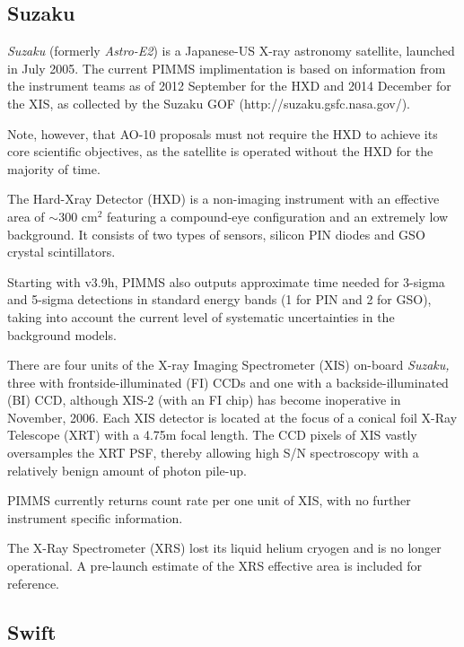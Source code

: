 \documentclass[11pt]{article}
\begin{document}
\subsection{Suzaku}

{\em Suzaku\/} (formerly {\em Astro-E2\/}) is a Japanese-US X-ray astronomy
satellite, launched in July 2005.  The current PIMMS implimentation is based
on information from the instrument teams as of 2012 September for the HXD
and 2014 December for the XIS, as collected by the Suzaku GOF
(http://suzaku.gsfc.nasa.gov/).

Note, however, that AO-10 proposals must not require the HXD to
achieve its core scientific objectives, as the satellite is operated
without the HXD for the majority of time.

The Hard-Xray Detector (HXD) is a non-imaging instrument with an effective
area of $\sim$300 cm$^2$ featuring a compound-eye configuration and an
extremely low background.  It consists of two types of sensors, silicon
PIN diodes and GSO crystal scintillators.

Starting with v3.9h, PIMMS also outputs approximate time needed for
3-sigma and 5-sigma detections in standard energy bands (1 for PIN
and 2 for GSO), taking into account the current level of systematic
uncertainties in the background models.

There are four units of the X-ray Imaging Spectrometer (XIS)
on-board {\em Suzaku,\/}
three with frontside-illuminated (FI) CCDs and one with a backside-illuminated
(BI) CCD, although XIS-2 (with an FI chip) has become inoperative
in November, 2006. Each XIS detector is located at the focus of a conical foil
X-Ray Telescope (XRT) with a 4.75m focal length.  The CCD pixels of XIS
vastly oversamples the XRT PSF, thereby allowing high S/N spectroscopy
with a relatively benign amount of photon pile-up.

PIMMS currently returns count rate per one unit of XIS, with no further
instrument specific information.

The X-Ray Spectrometer (XRS) lost its liquid helium cryogen and
is no longer operational.  A pre-launch estimate of the XRS effective
area is included for reference.

\subsection{Swift}
\end{document}
